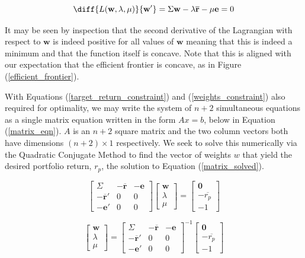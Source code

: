 \documentclass{article}
\begin{document}
\begin{equation}
\diff{L(\textbf{w}, \lambda, \mu)}{\textbf{w}'} =  \Sigma\textbf{w}
-\lambda \overline{\textbf{r}}
-\mu\textbf{e} = 0
\label{optimality_lagrangian}
\end{equation}

It may be seen by inspection that the second derivative of the Lagrangian with respect to $\textbf{w}$  is indeed positive for all values of $\textbf{w}$ meaning that this is indeed a minimum and that the function itself is concave. Note that this is aligned with our expectation that the efficient frontier is concave, as in Figure (\ref{efficient_frontier}).

With Equations (\ref{target_return_constraint}) and (\ref{weights_constraint}) also required for optimality, we may write the system of $n+2$ simultaneous equations as a single matrix equation written in the form $Ax = b$, below in Equation (\ref{matrix_eqn}). $A$ is an $n+2$ square matrix and the two column vectors both have dimensions $(n+2) \times 1$ respectively. We seek to solve this numerically via the Quadratic Conjugate Method to find the vector of weights $w$ that yield the desired portfolio return, $r_p$, the solution to Equation (\ref{matrix_solved}).

\begin{equation}
\begin{bmatrix}
\Sigma & -\overline{\textbf{r}} & -\textbf{e} \\
-\overline{\textbf{r}}'  & 0 & 0 \\
-\textbf{e}' & 0 & 0 
\end{bmatrix}
\begin{bmatrix}
\textbf{w}\\
\lambda \\
\mu
\end{bmatrix}
=
\begin{bmatrix}
\textbf{0}\\
-\overline{r_p}\\
-1
\end{bmatrix}
\label{matrix_eqn}
\end{equation}


\begin{equation}
\begin{bmatrix}
\textbf{w}\\
\lambda \\
\mu
\end{bmatrix}
=
\begin{bmatrix}
\Sigma & -\overline{\textbf{r}} & -\textbf{e} \\
-\overline{\textbf{r}}'  & 0 & 0 \\
-\textbf{e}' & 0 & 0 
\end{bmatrix}^{-1}
\begin{bmatrix}
\textbf{0}\\
-\overline{r_p}\\
-1
\end{bmatrix}
\label{matrix_solved}
\end{equation}
\end{document}

